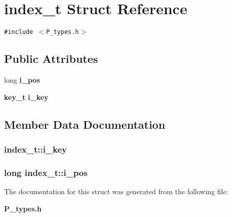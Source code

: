 \section{index\_\-t  Struct Reference}
\label{structindex__t}
{\tt \#include $<$P\_\-types.h$>$}

\subsection*{Public Attributes}
\begin{CompactItemize}
\item 
long {\bf i\_\-pos}
\item 
{\bf key\_\-t} {\bf i\_\-key}
\end{CompactItemize}


\subsection{Member Data Documentation}
\subsubsection{ index\_\-t::i\_\-key}\label{structindex__t_m1}


\subsubsection{\setlength{\rightskip}{0pt plus 5cm}long index\_\-t::i\_\-pos}\label{structindex__t_m0}




The documentation for this struct was generated from the following file:\begin{CompactItemize}
\item 
{\bf P\_\-types.h}\end{CompactItemize}
